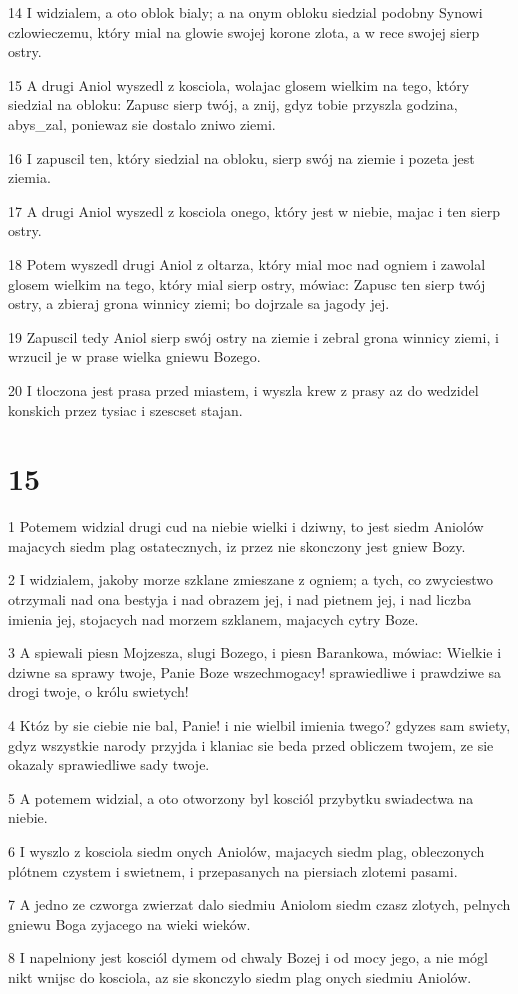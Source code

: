 \par 14 I widzialem, a oto oblok bialy; a na onym obloku siedzial podobny Synowi czlowieczemu, który mial na glowie swojej korone zlota, a w rece swojej sierp ostry.
\par 15 A drugi Aniol wyszedl z kosciola, wolajac glosem wielkim na tego, który siedzial na obloku: Zapusc sierp twój, a znij, gdyz tobie przyszla godzina, abys_zal, poniewaz sie dostalo zniwo ziemi.
\par 16 I zapuscil ten, który siedzial na obloku, sierp swój na ziemie i pozeta jest ziemia.
\par 17 A drugi Aniol wyszedl z kosciola onego, który jest w niebie, majac i ten sierp ostry.
\par 18 Potem wyszedl drugi Aniol z oltarza, który mial moc nad ogniem i zawolal glosem wielkim na tego, który mial sierp ostry, mówiac: Zapusc ten sierp twój ostry, a zbieraj grona winnicy ziemi; bo dojrzale sa jagody jej.
\par 19 Zapuscil tedy Aniol sierp swój ostry na ziemie i zebral grona winnicy ziemi, i wrzucil je w prase wielka gniewu Bozego.
\par 20 I tloczona jest prasa przed miastem, i wyszla krew z prasy az do wedzidel konskich przez tysiac i szescset stajan.

\chapter{15}

\par 1 Potemem widzial drugi cud na niebie wielki i dziwny, to jest siedm Aniolów majacych siedm plag ostatecznych, iz przez nie skonczony jest gniew Bozy.
\par 2 I widzialem, jakoby morze szklane zmieszane z ogniem; a tych, co zwyciestwo otrzymali nad ona bestyja i nad obrazem jej, i nad pietnem jej, i nad liczba imienia jej, stojacych nad morzem szklanem, majacych cytry Boze.
\par 3 A spiewali piesn Mojzesza, slugi Bozego, i piesn Barankowa, mówiac: Wielkie i dziwne sa sprawy twoje, Panie Boze wszechmogacy! sprawiedliwe i prawdziwe sa drogi twoje, o królu swietych!
\par 4 Któz by sie ciebie nie bal, Panie! i nie wielbil imienia twego? gdyzes sam swiety, gdyz wszystkie narody przyjda i klaniac sie beda przed obliczem twojem, ze sie okazaly sprawiedliwe sady twoje.
\par 5 A potemem widzial, a oto otworzony byl kosciól przybytku swiadectwa na niebie.
\par 6 I wyszlo z kosciola siedm onych Aniolów, majacych siedm plag, obleczonych plótnem czystem i swietnem, i przepasanych na piersiach zlotemi pasami.
\par 7 A jedno ze czworga zwierzat dalo siedmiu Aniolom siedm czasz zlotych, pelnych gniewu Boga zyjacego na wieki wieków.
\par 8 I napelniony jest kosciól dymem od chwaly Bozej i od mocy jego, a nie mógl nikt wnijsc do kosciola, az sie skonczylo siedm plag onych siedmiu Aniolów.

